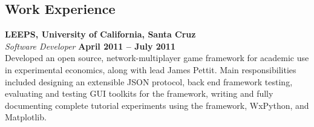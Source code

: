 \documentclass[margin,line]{resume}
\begin{document}
\begin{resume}
%
%
%
%
%

    \section{\mysidestyle Work Experience}

    \textbf{LEEPS, University of California, Santa Cruz} \vspace{2mm}\\\vspace{1mm}%
    \textsl{Software Developer} \hfill \textbf{April 2011 -- July 2011}\\
    Developed an open source, network-multiplayer game framework
    for academic use in experimental economics, along with lead
    James Pettit. Main responsibilities included designing an
    extensible JSON protocol, back end framework testing, evaluating
    and testing GUI toolkits for the framework, writing and fully
    documenting complete tutorial experiments using the framework,
    WxPython, and Matplotlib.


\end{resume}
\end{document}
